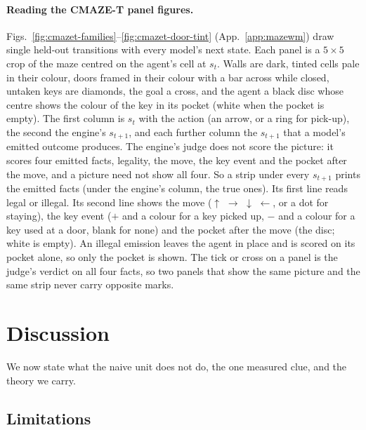 \documentclass{article} %
\begin{document}
\paragraph{Reading the CMAZE-T panel figures.} Figs.~\ref{fig:cmazet-families}--\ref{fig:cmazet-door-tint}
(App.~\ref{app:mazewm}) draw single held-out transitions with every model's next state. Each panel
is a $5\times5$ crop of the maze centred on the agent's cell at $s_t$. Walls are dark, tinted cells
pale in their colour, doors framed in their colour with a bar across while closed, untaken keys are
diamonds, the goal a cross, and the agent a black disc whose centre shows the colour of the key in its
pocket (white when the pocket is empty). The first column is $s_t$ with the action (an arrow, or a
ring for pick-up), the second the engine's $s_{t+1}$, and each further column the $s_{t+1}$ that a
model's emitted outcome produces. The engine's judge does not score the picture: it scores four
emitted facts, legality, the move, the key event and the pocket after the move, and a picture need
not show all four. So a strip under every $s_{t+1}$ prints the emitted facts (under the engine's
column, the true ones). Its first line reads legal or illegal. Its second line shows the move
($\uparrow$ $\rightarrow$ $\downarrow$ $\leftarrow$, or a dot for staying), the key event ($+$ and a
colour for a key picked up, $-$ and a colour for a key used at a door, blank for none) and the pocket
after the move (the disc; white is empty). An illegal emission leaves the agent in place and is scored
on its pocket alone, so only the pocket is shown. The tick or cross on a panel is the judge's verdict
on all four facts, so two panels that show the same picture and the same strip never carry opposite
marks.

\section{Discussion}
\label{sec:limits}

We now state what the naive unit does not do, the one measured clue, and the theory we carry.

\subsection{Limitations}
\label{sec:limits-list}
\end{document}
